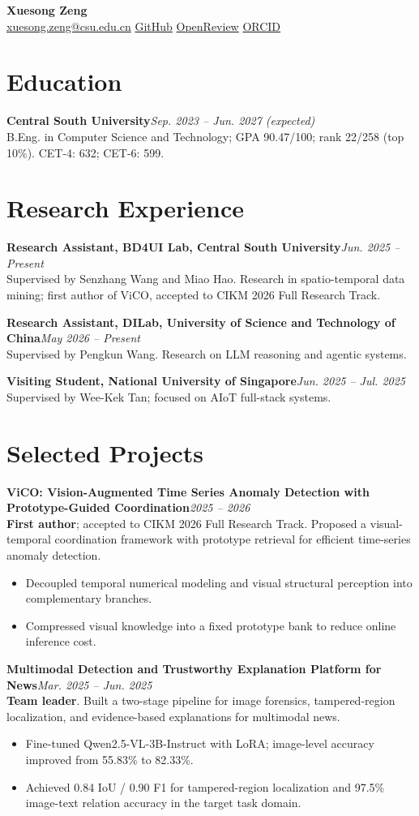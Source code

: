 \documentclass[10pt,a4paper]{article}
\newcommand{\entry}[3]{\noindent\textbf{#1}\hfill\textit{#2}\\#3\par}
\begin{document}
\begin{center}
  {\LARGE\bfseries Xuesong Zeng}\\[3pt]
  \href{mailto:xuesong.zeng@csu.edu.cn}{xuesong.zeng@csu.edu.cn} \quad
  \href{https://github.com/Cedarrr1}{GitHub} \quad
  \href{https://openreview.net/profile?id=~XueSong_Zeng1}{OpenReview} \quad
  \href{https://orcid.org/0009-0003-2928-641X}{ORCID}
\end{center}

\section{Education}
\entry{Central South University}{Sep. 2023 -- Jun. 2027 (expected)}{B.Eng. in Computer Science and Technology; GPA 90.47/100; rank 22/258 (top 10\%). CET-4: 632; CET-6: 599.}

\section{Research Experience}
\entry{Research Assistant, BD4UI Lab, Central South University}{Jun. 2025 -- Present}{Supervised by Senzhang Wang and Miao Hao. Research in spatio-temporal data mining; first author of ViCO, accepted to CIKM 2026 Full Research Track.}
\entry{Research Assistant, DILab, University of Science and Technology of China}{May 2026 -- Present}{Supervised by Pengkun Wang. Research on LLM reasoning and agentic systems.}
\entry{Visiting Student, National University of Singapore}{Jun. 2025 -- Jul. 2025}{Supervised by Wee-Kek Tan; focused on AIoT full-stack systems.}

\section{Selected Projects}
\entry{ViCO: Vision-Augmented Time Series Anomaly Detection with Prototype-Guided Coordination}{2025 -- 2026}{\textbf{First author}; accepted to CIKM 2026 Full Research Track. Proposed a visual-temporal coordination framework with prototype retrieval for efficient time-series anomaly detection.}
\begin{itemize}
  \item Decoupled temporal numerical modeling and visual structural perception into complementary branches.
  \item Compressed visual knowledge into a fixed prototype bank to reduce online inference cost.
\end{itemize}

\entry{Multimodal Detection and Trustworthy Explanation Platform for News}{Mar. 2025 -- Jun. 2025}{\textbf{Team leader}. Built a two-stage pipeline for image forensics, tampered-region localization, and evidence-based explanations for multimodal news.}
\begin{itemize}
  \item Fine-tuned Qwen2.5-VL-3B-Instruct with LoRA; image-level accuracy improved from 55.83\% to 82.33\%.
  \item Achieved 0.84 IoU / 0.90 F1 for tampered-region localization and 97.5\% image-text relation accuracy in the target task domain.
\end{itemize}
\end{document}
